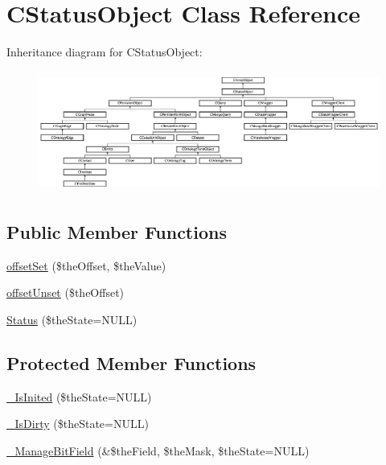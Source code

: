 \hypertarget{class_c_status_object}{\section{C\-Status\-Object Class Reference}
\label{class_c_status_object}
}
Inheritance diagram for C\-Status\-Object\-:\begin{figure}[H]
\begin{center}
\leavevmode
\includegraphics[height=4.000000cm]{class_c_status_object}
\end{center}
\end{figure}
\subsection*{Public Member Functions}
\begin{DoxyCompactItemize}
\item 
\hyperlink{class_c_status_object_a140ef140d4fa1c4a6180e843bd5ec969}{offset\-Set} (\$the\-Offset, \$the\-Value)
\item 
\hyperlink{class_c_status_object_ae733db1bbfffcbe894ea405765ab4150}{offset\-Unset} (\$the\-Offset)
\item 
\hyperlink{class_c_status_object_a6c68cf419c07a3af8ef7e83690590235}{Status} (\$the\-State=N\-U\-L\-L)
\end{DoxyCompactItemize}
\subsection*{Protected Member Functions}
\begin{DoxyCompactItemize}
\item 
\hyperlink{class_c_status_object_a8429102e4f52f7558649b64f4e673a69}{\-\_\-\-Is\-Inited} (\$the\-State=N\-U\-L\-L)
\item 
\hyperlink{class_c_status_object_a19c4ac94dfe26476e780d77b99744d43}{\-\_\-\-Is\-Dirty} (\$the\-State=N\-U\-L\-L)
\item 
\hyperlink{class_c_status_object_a3e37d72a6462d93bf7ff567f07f78093}{\-\_\-\-Manage\-Bit\-Field} (\&\$the\-Field, \$the\-Mask, \$the\-State=N\-U\-L\-L)
\end{DoxyCompactItemize}
